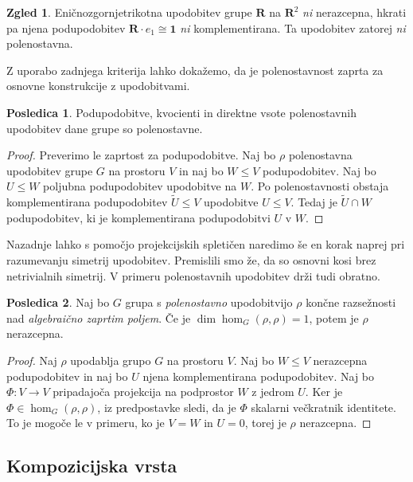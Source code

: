 \documentclass[11pt]{book}
\def\RR{\mathbf{R}}
\def\11{\mathbf{1}}
\theoremstyle{definition}
\theoremstyle{zgled}
\newtheorem*{zgled}{Zgled}
\theoremstyle{odprtproblem}
\theoremstyle{domacanaloga}
\newenvironment{dokaz}
    {\color{siva}\begin{proof}}
    {\end{proof}}
\theoremstyle{izrek}
\newtheorem*{posledica}{Posledica}
\begin{document}
\begin{zgled}
    Eničnozgornjetrikotna upodobitev grupe $\RR$ na $\RR^2$ \emph{ni} nerazcepna, hkrati pa njena podupodobitev $\RR \cdot e_1 \cong \11$ \emph{ni} komplementirana. Ta upodobitev zatorej \emph{ni} polenostavna.
\end{zgled}

Z uporabo zadnjega kriterija lahko dokažemo, da je polenostavnost zaprta za osnovne konstrukcije z upodobitvami.

\begin{posledica}
Podupodobitve, kvocienti in direktne vsote polenostavnih upodobitev dane grupe so polenostavne.
\end{posledica}
\begin{dokaz}
Preverimo le zaprtost za podupodobitve. Naj bo $\rho$ polenostavna upodobitev grupe $G$ na prostoru $V$ in naj bo $W \leq V$ podupodobitev. Naj bo $U \leq W$ poljubna podupodobitev upodobitve na $W$. Po polenostavnosti obstaja komplementirana podupodobitev $\tilde U \leq V$ upodobitve $U \leq V$. Tedaj je $\tilde U \cap W$ podupodobitev, ki je komplementirana podupodobitvi $U$ v $W$.
\end{dokaz}

Nazadnje lahko s pomočjo projekcijskih spletičen naredimo še en korak naprej pri razumevanju simetrij upodobitev. Premislili smo že, da so osnovni kosi brez netrivialnih simetrij. V primeru polenostavnih upodobitev drži tudi obratno.

\begin{posledica}
Naj bo $G$ grupa s \emph{polenostavno} upodobitvijo $\rho$ končne razsežnosti nad \emph{algebraično zaprtim poljem}. Če je $\dim \hom_G(\rho, \rho) = 1$, potem je $\rho$ nerazcepna.
\end{posledica}
\begin{dokaz}
Naj $\rho$ upodablja grupo $G$ na prostoru $V$. Naj bo $W \leq V$ nerazcepna podupodobitev in naj bo $U$ njena komplementirana podupodobitev. Naj bo $\Phi \colon V \to V$ pripadajoča projekcija na podprostor $W$ z jedrom $U$. Ker je $\Phi \in \hom_G(\rho, \rho)$, iz predpostavke sledi, da je $\Phi$ skalarni večkratnik identitete. To je mogoče le v primeru, ko je $V = W$ in $U = 0$, torej je $\rho$ nerazcepna. 
\end{dokaz}


\subsection{Kompozicijska vrsta}
\end{document}
